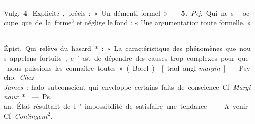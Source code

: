 \begin{itemize}[leftmargin=1cm, label=, itemsep=1pt]
— \si{Vulg.} {\bf 4.} Explicite, précis :« Un démenti formel ». — {\bf 5.}
{\it Péj.} Qui ne s'occupe que de la forme$^3$ et néglige le fond : « Une
argumentation toute formelle. »

 — \si{Épist.} Qui relève du hasard* : « La caractéristique des
phénomènes que nous appelons fortuits, c’est de dépendre des causes trop
complexes pour que nous puissions les connaître toutes » (Borel).

 [trad. angl. {\it margin}]. — \si{Psycho.}
{\it Chez James} : halo subconscient qui
enveloppe certains faits de conscience. Cf. {\it Marginaux}*.

 — \si{Ps. an.} État résultant
de l'impossibilité de satisfaire une tendance.

 — A venir. Cf. {\it Contingent}$^2$.

	\end{itemize}

